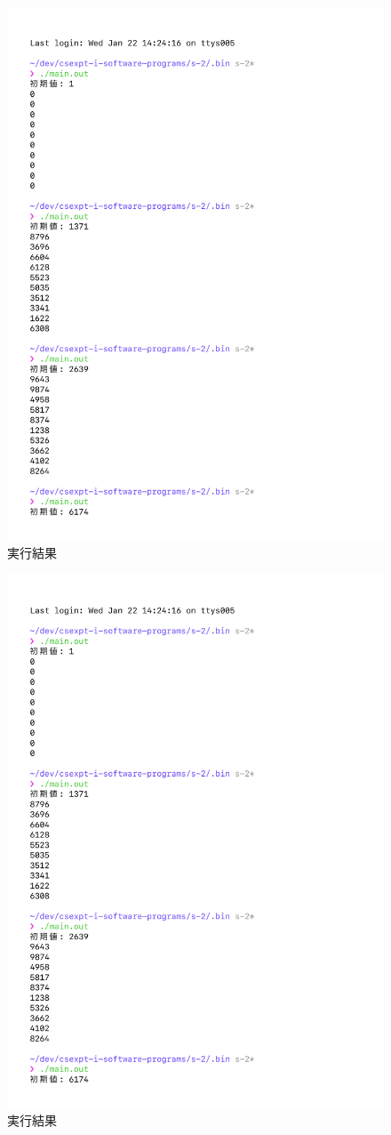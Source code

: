% 
\begin{figure}[H]
    \centering
    \includegraphics[width=0.8\hsize, pagebox=mediabox, page=1]{main_result.pdf}
    \caption{実行結果}
    \label{実行結果}
\end{figure}
\begin{figure}[H]
    \ContinuedFloat
    \centering
    \includegraphics[width=0.8\hsize, pagebox=mediabox, page=2]{main_result.pdf}
    \caption{実行結果}
    \label{実行結果}
\end{figure}
